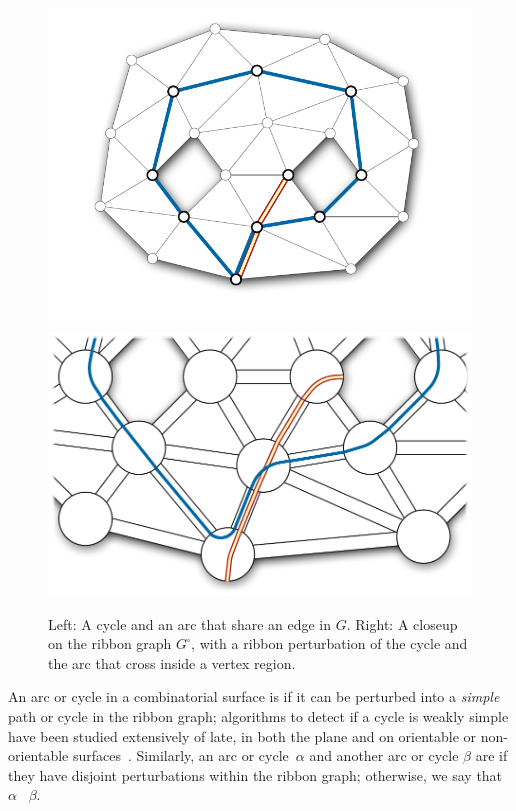 \documentclass[letterpaper,review]{siamart190516}
\begin{document}
\begin{figure}[htb]
\centering
\includegraphics[scale=0.45]{Fig/pants-ribbon}\hfil
\includegraphics[scale=0.45]{Fig/pants-ribbon-2}
\caption{Left: A cycle and an arc that share an edge in $G$.  Right: A closeup on the ribbon graph $G^\square$, with a ribbon perturbation of the cycle and the arc that cross inside a vertex region.}
\label{F:ribbon}
\end{figure}

An arc or cycle in a combinatorial surface is  if it can be perturbed into a \emph{simple} path or cycle in the ribbon graph; algorithms to detect if a cycle is weakly simple have been studied extensively of late, in both the plane and on orientable or non-orientable surfaces~\cite{cex-dwsp-15,aaet-rwsp-17}.
Similarly, an arc or cycle~$\alpha$ and another arc or cycle $\beta$ are  if they have disjoint perturbations within the ribbon graph; otherwise, we say that $\alpha$ ~$\beta$.  
\end{document}
